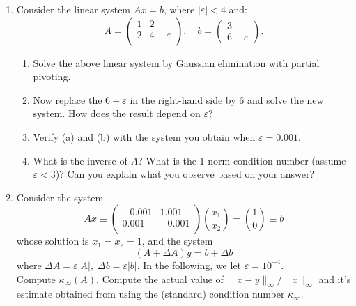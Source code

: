 \documentclass[11pt]{article}
\newcommand{\n}{\vspace{0.3cm}}
\begin{document}
\begin{enumerate}
	\item Consider the linear system \(Ax = b\), where \(|\varepsilon| < 4\) and:
	      \[
		      A = \left(\begin{array}{cc} 1 & 2 \\ 2 & 4-\varepsilon \\ \end{array}\right), \quad
		      b = \left(\begin{array}{c} 3 \\ 6-\varepsilon \end{array}\right).
	      \]
	      \begin{enumerate}
		      \item Solve the above linear system by Gaussian elimination with partial pivoting.
		      \item Now replace the \(6-\varepsilon\) in the right-hand side by 6 and solve the new system.  How does the result depend on \(\varepsilon\)?
		      \item Verify (a) and (b) with the system you obtain when \(\varepsilon = 0.001\).
		      \item What is the inverse of \(A\)?  What is the 1-norm condition number (assume \(\varepsilon < 3\))?  Can you explain what you observe based on your answer?
	      \end{enumerate}

	\item Consider the system
	      \[
		      Ax \equiv \left(\begin{array}{rr} -0.001 & 1.001 \\ 0.001 & -0.001 \\ \end{array}\right)
		      \binom{x_1}{x_2} = \binom10 \equiv b
	      \]
	      whose solution is \(x_1 = x_2 = 1\), and the system
	      \[(A + \Delta A)y = b + \Delta b\]
	      where \(\Delta A = \varepsilon|A|, \; \Delta b = \varepsilon|b|\).  In the following, we let \(\varepsilon = 10^{-4}\). \n\\
	      Compute \(\kappa_\infty(A)\).  Compute the actual value of \(\lVert x-y \rVert_\infty / \lVert x \rVert_\infty\) and it's estimate obtained from using the (standard) condition number \(\kappa_\infty\).


\end{enumerate}
\end{document}
